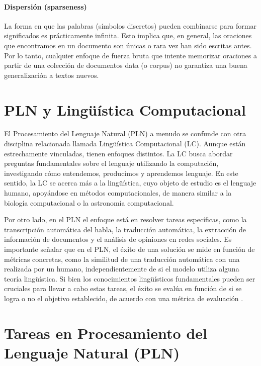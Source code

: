 \paragraph{Dispersión (sparseness)}

La forma en que las palabras (símbolos discretos) pueden combinarse para formar significados es prácticamente infinita. Esto implica que, en general, las oraciones que encontramos en un documento son únicas o rara vez han sido escritas antes. Por lo tanto, cualquier enfoque de fuerza bruta que intente memorizar oraciones a partir de una colección de documentos data (o corpus) no garantiza una buena generalización a textos nuevos.






\section{PLN y Lingüística Computacional}

El Procesamiento del Lenguaje Natural (PLN) a menudo se confunde con otra disciplina relacionada llamada Lingüística Computacional (LC). Aunque están estrechamente vinculadas, tienen enfoques distintos. La LC busca abordar preguntas fundamentales sobre el lenguaje utilizando la computación, investigando cómo entendemos, producimos y aprendemos lenguaje. En este sentido, la LC se acerca más a la lingüística, cuyo objeto de estudio es el lenguaje humano, apoyándose en métodos computacionales, de manera similar a la biología computacional o la astronomía computacional.

Por otro lado, en el PLN el enfoque está en resolver tareas específicas, como la transcripción automática del habla, la traducción automática, la extracción de información de documentos y el análisis de opiniones en redes sociales. Es importante señalar que en el PLN, el éxito de una solución se mide en función de métricas concretas, como la similitud de una traducción automática con una realizada por un humano, independientemente de si el modelo utiliza alguna teoría lingüística. Si bien los conocimientos lingüísticos fundamentales pueden ser cruciales para llevar a cabo estas tareas, el éxito se evalúa en función de si se logra o no el objetivo establecido, de acuerdo con una métrica de evaluación \cite{jacobbook}.

\section{Tareas en Procesamiento del Lenguaje Natural (PLN)}

